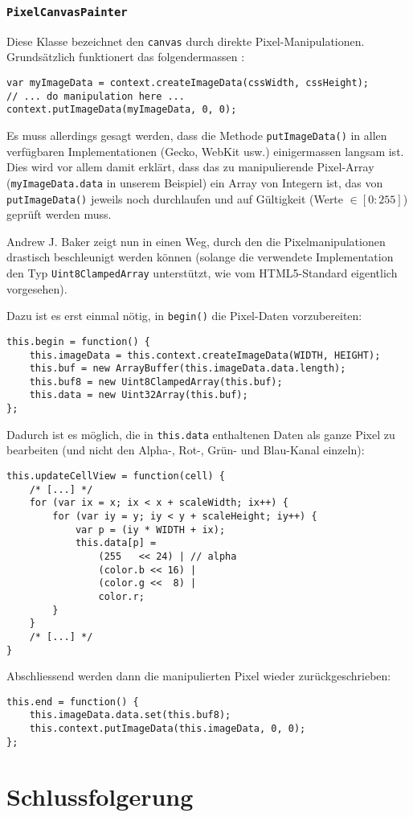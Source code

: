 \documentclass[11pt]{article} %
\theoremstyle{definition}
\begin{document}
\subsubsection{{\tt PixelCanvasPainter}}

Diese Klasse bezeichnet den {\tt canvas} durch direkte Pixel-Manipulationen. Grundsätzlich funktionert das folgendermassen \cite{mdn:PixelCanvasDoku}:

\begin{lstlisting}
var myImageData = context.createImageData(cssWidth, cssHeight);
// ... do manipulation here ...
context.putImageData(myImageData, 0, 0);
\end{lstlisting}

Es muss allerdings gesagt werden, dass die Methode {\tt putImageData()} in allen verfügbaren Implementationen (Gecko, WebKit usw.) einigermassen langsam ist. Dies wird vor allem damit erklärt, dass das zu manipulierende Pixel-Array ({\tt myImageData.data} in unserem Beispiel) ein Array von Integern ist, das von {\tt putImageData()} jeweils noch durchlaufen und auf Gültigkeit (Werte $\in [0: 255]$) geprüft werden muss.

Andrew J. Baker zeigt nun in \cite{mdn:PixelCanvas} einen Weg, durch den die Pixelmanipulationen drastisch beschleunigt werden können (solange die verwendete Implementation den Typ {\tt Uint8ClampedArray} unterstützt, wie vom HTML5-Standard  \cite{wthree:twodcanvas} eigentlich vorgesehen).

Dazu ist es erst einmal nötig, in {\tt begin()} die Pixel-Daten vorzubereiten:

\begin{lstlisting}
this.begin = function() {
	this.imageData = this.context.createImageData(WIDTH, HEIGHT);
	this.buf = new ArrayBuffer(this.imageData.data.length);
	this.buf8 = new Uint8ClampedArray(this.buf);
	this.data = new Uint32Array(this.buf);
};
\end{lstlisting}

Dadurch ist es möglich, die in {\tt this.data} enthaltenen Daten als ganze Pixel zu bearbeiten (und nicht den Alpha-, Rot-, Grün- und Blau-Kanal einzeln):

\begin{lstlisting}
this.updateCellView = function(cell) {
	/* [...] */
	for (var ix = x; ix < x + scaleWidth; ix++) {
		for (var iy = y; iy < y + scaleHeight; iy++) {
			var p = (iy * WIDTH + ix);		
			this.data[p] =
				(255   << 24) | // alpha
				(color.b << 16) |
				(color.g <<  8) |
				color.r;
		}
	}
	/* [...] */
}
\end{lstlisting}

Abschliessend werden dann die manipulierten Pixel wieder zurückgeschrieben:

\begin{lstlisting}
this.end = function() {
	this.imageData.data.set(this.buf8);
	this.context.putImageData(this.imageData, 0, 0);
};
\end{lstlisting}

\section{Schlussfolgerung}



\end{document}
